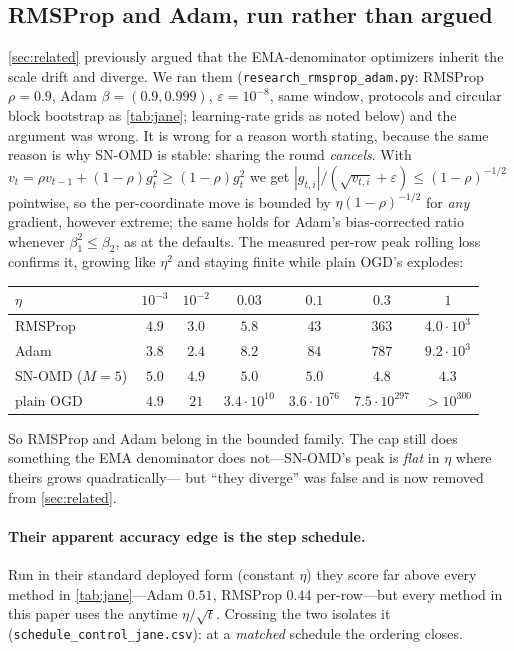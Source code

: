 \documentclass{article}
\newcommand{\gt}{g_t}
\begin{document}
\subsection{RMSProp and Adam, run rather than argued}
\label{app:adaptive}

\cref{sec:related} previously argued that the EMA-denominator optimizers inherit the scale drift
and diverge. We ran them (\texttt{research\_rmsprop\_adam.py}: RMSProp $\rho{=}0.9$, Adam
$\beta{=}(0.9,0.999)$, $\varepsilon{=}10^{-8}$, same window, protocols and circular block
bootstrap as \cref{tab:jane}; learning-rate grids as noted below) and the argument was wrong. It is wrong for a reason worth stating,
because the same reason is why SN-OMD is stable: sharing the round \emph{cancels}. With
$v_t=\rho v_{t-1}+(1-\rho)\gt^2\ge(1-\rho)\gt^2$ we get
$|g_{t,i}|/(\sqrt{v_{t,i}}+\varepsilon)\le(1-\rho)^{-1/2}$ pointwise, so the per-coordinate move
is bounded by $\eta(1-\rho)^{-1/2}$ for \emph{any} gradient, however extreme; the same holds for
Adam's bias-corrected ratio whenever $\beta_1^2\le\beta_2$, as at the defaults. The measured
per-row peak rolling loss confirms it, growing like $\eta^2$ and staying finite while plain
OGD's explodes:

\begin{center}
\begin{small}
\begin{tabular}{lcccccc}
\toprule
$\eta$ & $10^{-3}$ & $10^{-2}$ & $0.03$ & $0.1$ & $0.3$ & $1$ \\
\midrule
RMSProp        & $4.9$ & $3.0$ & $5.8$ & $43$ & $363$ & $4.0{\cdot}10^{3}$ \\
Adam           & $3.8$ & $2.4$ & $8.2$ & $84$ & $787$ & $9.2{\cdot}10^{3}$ \\
SN-OMD ($M{=}5$) & $5.0$ & $4.9$ & $5.0$ & $5.0$ & $4.8$ & $4.3$ \\
plain OGD      & $4.9$ & $21$ & $3.4{\cdot}10^{10}$ & $3.6{\cdot}10^{76}$ & $7.5{\cdot}10^{297}$ & $>\!10^{300}$ \\
\bottomrule
\end{tabular}
\end{small}
\end{center}

\noindent So RMSProp and Adam belong in the bounded family. The cap still does something the EMA
denominator does not---SN-OMD's peak is \emph{flat} in $\eta$ where theirs grows quadratically---%
but ``they diverge'' was false and is now removed from \cref{sec:related}.

\paragraph{Their apparent accuracy edge is the step schedule.} Run in their standard deployed
form (constant $\eta$) they score far above every method in \cref{tab:jane}---Adam $0.51$,
RMSProp $0.44$ per-row---but every method in this paper uses the anytime $\eta/\sqrt t$. Crossing
the two isolates it (\texttt{schedule\_control\_jane.csv}): at a \emph{matched} schedule the
ordering closes.
\end{document}
